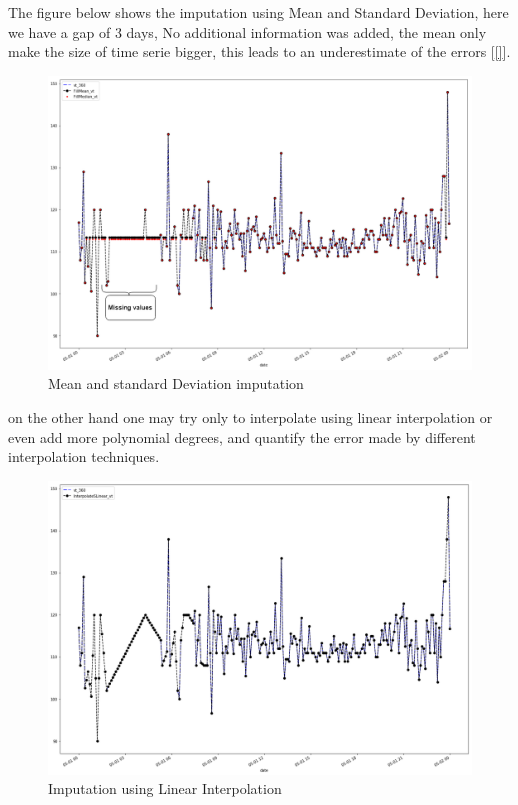The figure below shows the imputation  using Mean and Standard Deviation,  here we have a gap of 3 days, No additional information was added, the mean only make  the size of time serie bigger, this leads to an underestimate of the errors [\ref{}].
%
\begin{figure}[H]
\centering
\includegraphics[scale=.4]{img/mean_median.png} 
\caption{Mean and standard Deviation imputation}
\label{fig:presteps}
\end{figure}
%
on the other hand one may try only to interpolate using linear interpolation or even add more polynomial degrees, and quantify the error made by different interpolation techniques.

\begin{figure}[H]
\centering
\includegraphics[scale=.33]{img/linear.png} 
\caption{Imputation using Linear Interpolation }
\label{fig:presteps}
\end{figure}


